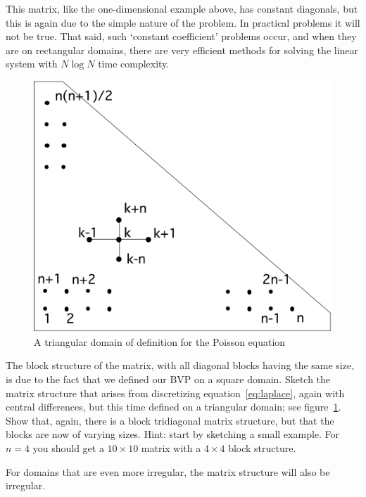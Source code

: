 
This matrix, like the one-dimensional example above, has constant
diagonals, but this is again due to the simple nature of the
problem. In practical problems it will not be true. That said,
such `constant coefficient' problems occur, and when they are on
rectangular domains, there are very efficient methods for solving
the linear system with $N\log N$ time complexity.
\begin{figure}
  \includegraphics[scale=.1]{graphics/laplacetriangle}
  \caption{A triangular domain of definition for the Poisson equation}
  \label{fig:laplacetriangle}
\end{figure}

\begin{exercise}
  The block structure of the matrix, with all diagonal blocks having
  the same size, is due to the fact that we defined our \ac{BVP} on a
  square domain. Sketch the matrix structure that arises from
  discretizing equation~\eqref{eq:laplace}, again with central
  differences, but this time defined on a triangular domain; see
  figure~\ref{fig:laplacetriangle}. Show that, again, there is a block
  tridiagonal matrix structure, but that the blocks are now of varying
  sizes. Hint: start by sketching a small example. For $n=4$ you
  should get a $10\times 10$ matrix with a $4\times 4$ block structure.
\end{exercise}
For domains that are even more irregular, the matrix structure will
also be irregular.%

